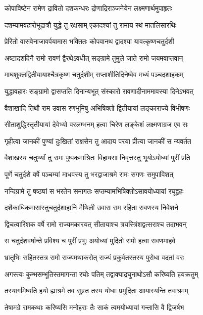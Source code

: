 \twolineshloka
{कोपाविष्टेन रामेण द्रावितो दशकन्धरः}
{द्रोणाद्रिराञ्जनेयेन लक्ष्मणार्थमुपाहृतः}%

\twolineshloka
{दशम्यामवहारोभूद्रात्रौ युद्धे तु रक्षसाम्}
{एकादश्यां तु रामाय रथं मातलिसारथिः}%

\twolineshloka
{प्रेरितो वासवेनाजावर्पयामास भक्तितः}
{कोपवानथ द्वादश्या यावत्कृष्णचतुर्दशी}%

\twolineshloka
{अष्टादशदिनै रामो रावणं द्वैरथेऽवधीत्}
{सङ्ग्रामे तुमुले जाते रामो जयमवाप्तवान्}%

\twolineshloka
{माघशुक्लद्वितीयायाश्चैत्रकृष्ण चतुर्दशीम्}
{सप्ताशीतिदिनेष्वेव मध्यं पञ्चदशाहकम्}%

\twolineshloka
{युद्धावहारः सङ्ग्रामो द्वासप्तति दिनान्यभूत्}
{संस्कारो रावणादीनाममावस्या दिनेऽभवत्}%

\twolineshloka
{वैशाखादि तिथौ राम उवास रणभूमिषु}
{अभिषिक्तो द्वितीयायां लङ्काराज्ये विभीषणः}%

\twolineshloka
{सीताशुद्धिस्तृतीयायां देवेभ्यो वरलम्भनम्}
{हत्वा चिरेण लङ्केशं लक्ष्मणाग्रज एव सः}%

\twolineshloka
{गृहीत्वा जानकीं पुण्यां दुःखितां राक्षसेन तु}
{आदाय परया प्रीत्या जानकीं स न्यवर्तत}%

\twolineshloka
{वैशाखस्य चतुर्थ्यां तु रामः पुष्पकमाश्रितः}
{विहायसा निवृत्तस्तु भूयोऽयोध्यां पुरीं प्रति}%

\twolineshloka
{पूर्णे चतुर्दशे वर्षे पञ्चम्यां माधवस्य तु}
{भरद्वाजाश्रमे रामः सगणः समुपाविशत्}%

\twolineshloka
{नन्दिग्रामे तु षष्ठ्यां स भरतेन समागतः}
{सप्तम्यामभिषिक्तोऽसावयोध्यायां रघूद्वहः}%

\twolineshloka
{दशैकाधिकमासांस्तुचतुर्दशाहानि मैथिली}
{उवास राम रहिता रावणस्य निवेशने}%

\twolineshloka
{द्विचत्वारिंशक वर्षे रामो राज्यमकारयत्}
{सीतायाश्च त्रयस्त्रिंशद्वत्सराश्च तदाभवन्}%

\twolineshloka
{स चतुर्दशवर्षान्ते प्रविश्य च पुरीं प्रभुः}
{अयोध्यां मुदितो रामो हत्वा रावणमाहवे}%

\twolineshloka
{भ्रातृभिः सहितस्तत्र रामो राज्यमथाकरोत्}
{राज्यं प्रकुर्वतस्तस्य पुरोधा वदतां वरः}%

\twolineshloka
{अगस्त्यः कुम्भसम्भूतिस्तमागन्ता रघोः पतिम्}
{तद्वाक्याद्रघुनाथोऽसौ करिष्यति हयक्रतुम्}%

\twolineshloka
{तस्यागमिष्यति हयो ह्याश्रमे तव सुव्रत}
{तस्य योधाः प्रमुदिता आयास्यन्ति तवाश्रमम्}%

\twolineshloka
{तेषामग्रे रामकथाः करिष्यसि मनोहराः}
{तैः साकं त्वमयोध्यायां गन्तासि वै द्विजर्षभ}%

